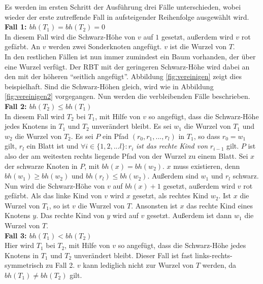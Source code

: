\documentclass[a4paper,12pt]{article}
\begin{document}
Es werden im ersten Schritt der Ausführung drei Fälle unterschieden, wobei wieder der erste zutreffende Fall in aufsteigender Reihenfolge ausgewählt wird. \\
\noindent\textbf{Fall 1: $bh(T_1) = bh(T_2) = 0$ }\\   
In diesem Fall wird die Schwarz-Höhe von $v$  auf $1$ gesetzt, außerdem wird $v$ rot gefärbt. An $v$ werden zwei Sonderknoten angefügt. $v$ ist die Wurzel von $T$. \\
In den restlichen Fällen ist nun immer zumindest ein Baum vorhanden, der über eine Wurzel verfügt. Der RBT mit der geringeren Schwarz-Höhe wird dabei an den mit der höheren \enquote{seitlich angefügt}. Abbildung \ref{fig:vereinigen} zeigt dies beispielhaft. Sind die Schwarz-Höhen gleich, wird wie in Abbildung \ref{fig:vereinigen2} vorgegangen. Nun werden die verbleibenden Fälle beschrieben.\\
\noindent\textbf{Fall 2: $bh(T_2) \leq bh(T_1)$ }\\
In diesem Fall wird $T_2$ bei $T_1$, mit Hilfe von $v$ so angefügt, dass die Schwarz-Höhe jedes Knotens in $T_1$ und $T_2$ unverändert bleibt. Es sei $w_1$ die Wurzel von $T_1$ und $w_2$ die Wurzel von $T_2$. Es sei $P$ ein Pfad $(r_0,r_1,...,r_l)$ in $T_1$, so dass $r_0 = w_1$  gilt, $r_l$ ein Blatt ist und $\forall i \in \{1,2,...l\} \colon r_i$  \textit{ist das rechte Kind von}  $r_{i-1}$ gilt. $P$ ist also der am weitesten rechts liegende Pfad von der Wurzel zu einem Blatt. Sei $x$ der schwarze Knoten in $P$, mit $\mathit{bh}(x) = \mathit{bh}(w_2)$. $x$ muss existieren, denn $\mathit{bh}(w_1) \geq \mathit{bh}(w_2)$ und $\mathit{bh}(r_l) \leq  \mathit{bh}(w_2)$. Außerdem sind $w_1$ und $r_l$ schwarz.\\
Nun wird die Schwarz-Höhe von $v$ auf $\mathit{bh}(x) + 1$ gesetzt, außerdem wird $v$ rot gefärbt. Als das linke Kind von $v$  wird $x$ gesetzt, als rechtes Kind $w_2$. Ist $x$ die Wurzel von $T_1$, so ist $v$ die Wurzel von $T$. Ansonsten ist $x$ das rechte Kind eines Knotens $y$. Das rechte Kind von $y$ wird auf $v$ gesetzt. Außerdem ist dann $w_1$ die Wurzel von $T$.     \\  
\noindent\textbf{Fall 3: $bh(T_1) < bh(T_2)$ }\\ 
Hier wird $T_1$ bei $T_2$, mit Hilfe von $v$ so angefügt, dass die Schwarz-Höhe jedes Knotens in $T_1$ und $T_2$  unverändert bleibt. Dieser Fall ist fast links-rechts-symmetrisch zu Fall 2. $v$ kann lediglich nicht zur Wurzel von $T$ werden, da $bh(T_1) \neq bh(T_2)$ gilt.
\end{document}
